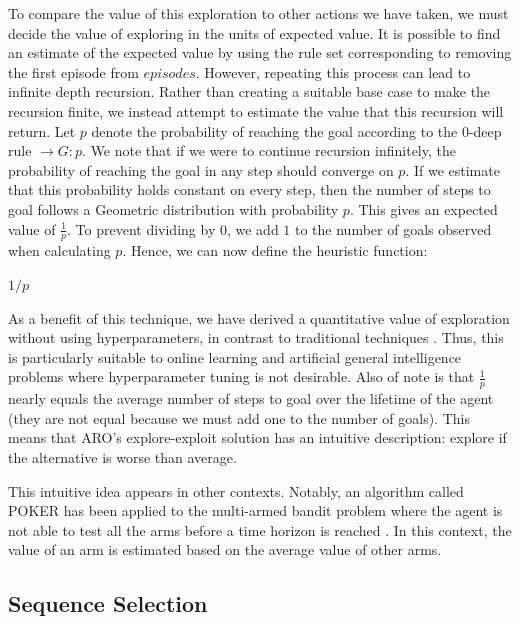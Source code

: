\documentclass[letterpaper]{article} %
\begin{document}
To compare the value of this exploration to other actions we have
taken, we must decide the value of exploring in the units of expected
value.  It is possible to find an estimate of the expected value by
using the rule set corresponding to removing the first episode from
$episodes$. However, repeating this process can lead to infinite depth
recursion. Rather than creating a suitable base case to make the
recursion finite, we instead attempt to estimate the value that this
recursion will return. Let $p$ denote the probability of reaching the
goal according to the $0$-deep rule $\rightarrow G : p$. We note that
if we were to continue recursion infinitely, the probability of
reaching the goal in any step should converge on $p$. If we estimate
that this probability holds constant on every step, then the number of
steps to goal follows a Geometric distribution with probability
$p$. This gives an expected value of $\frac{1}{p}$. To prevent
dividing by $0$, we add $1$ to the number of goals observed when
calculating $p$. Hence, we can now define the heuristic function:

\begin{algorithmic}[-1]
	
		\State \Return $1/p$
	\EndFunction
	
\end{algorithmic}

As a benefit of this technique, we have derived a quantitative value
of exploration without using hyperparameters, in contrast to
traditional techniques \cite{Sutton98,Kearns02,Brafman02}. Thus, this
is particularly suitable to online learning and artificial general
intelligence problems where hyperparameter tuning is not
desirable. Also of note is that $\frac{1}{p}$ nearly equals the
average number of steps to goal over the lifetime of the agent (they
are not equal because we must add one to the number of goals). This
means that ARO's explore-exploit solution has an intuitive
description: explore if the alternative is worse than average.

This intuitive idea appears in other contexts.  Notably, an algorithm
called POKER has been applied to the multi-armed bandit problem where
the agent is not able to test all the arms before a time horizon is
reached \cite{Vermore05}.  In this context, the value of an arm is
estimated based on the average value of other arms.



\subsection{Sequence Selection}
\end{document}
